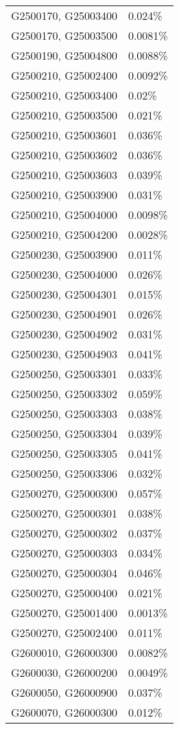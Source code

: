\begin{longtable}[]{@{}ll@{}}
G2500170, G25003400 & 0.024\% \\
G2500170, G25003500 & 0.0081\% \\
G2500190, G25004800 & 0.0088\% \\
G2500210, G25002400 & 0.0092\% \\
G2500210, G25003400 & 0.02\% \\
G2500210, G25003500 & 0.021\% \\
G2500210, G25003601 & 0.036\% \\
G2500210, G25003602 & 0.036\% \\
G2500210, G25003603 & 0.039\% \\
G2500210, G25003900 & 0.031\% \\
G2500210, G25004000 & 0.0098\% \\
G2500210, G25004200 & 0.0028\% \\
G2500230, G25003900 & 0.011\% \\
G2500230, G25004000 & 0.026\% \\
G2500230, G25004301 & 0.015\% \\
G2500230, G25004901 & 0.026\% \\
G2500230, G25004902 & 0.031\% \\
G2500230, G25004903 & 0.041\% \\
G2500250, G25003301 & 0.033\% \\
G2500250, G25003302 & 0.059\% \\
G2500250, G25003303 & 0.038\% \\
G2500250, G25003304 & 0.039\% \\
G2500250, G25003305 & 0.041\% \\
G2500250, G25003306 & 0.032\% \\
G2500270, G25000300 & 0.057\% \\
G2500270, G25000301 & 0.038\% \\
G2500270, G25000302 & 0.037\% \\
G2500270, G25000303 & 0.034\% \\
G2500270, G25000304 & 0.046\% \\
G2500270, G25000400 & 0.021\% \\
G2500270, G25001400 & 0.0013\% \\
G2500270, G25002400 & 0.011\% \\
G2600010, G26000300 & 0.0082\% \\
G2600030, G26000200 & 0.0049\% \\
G2600050, G26000900 & 0.037\% \\
G2600070, G26000300 & 0.012\% \\

\end{longtable}
